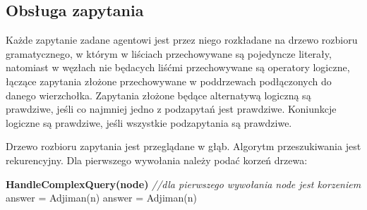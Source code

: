 \documentclass[a4paper,12pt]{mwart}
\begin{document}
\subsection{Obsługa zapytania}
Każde zapytanie zadane agentowi jest przez niego rozkładane na drzewo rozbioru gramatycznego, w którym w liściach przechowywane są pojedyncze literały, natomiast w węzłach nie będacych liśćmi przechowywane są operatory logiczne, łączące zapytania złożone przechowywane w poddrzewach podłączonych do danego wierzchołka.
Zapytania złożone będące alternatywą logiczną są prawdziwe, jeśli co najmniej jedno z podzapytań jest prawdziwe. Koniunkcje logiczne są prawdziwe, jeśli wszystkie podzapytania są prawdziwe.

Drzewo rozbioru zapytania jest przeglądane w głąb. Algorytm przeszukiwania jest rekurencyjny. Dla pierwszego wywołania należy podać korzeń drzewa:
\begin{algorithm}
\begin{algorithmic}
\STATE \textbf{HandleComplexQuery(node)}
\textit{//dla pierwszego wywołania node jest korzeniem}
\ENDIF    
{}
             	\STATE answer = Adjiman(n)
                \RETURN{\TRUE}
		\ENDIF
	    \ENDFOR
            \RETURN{\FALSE}
\ENDIF
{}
\STATE answer = Adjiman(n)
                    \RETURN{\FALSE}
\ENDIF
\ENDFOR
\RETURN{\TRUE}
\ENDIF
\ENDIF
\end{algorithmic}
\end{algorithm}
\end{document}
